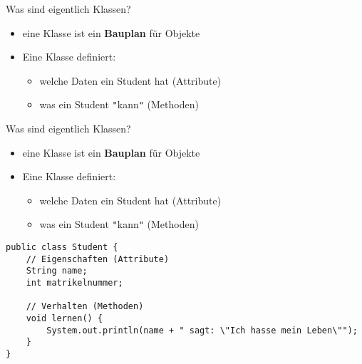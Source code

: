 \documentclass{../../presentation}
\begin{document}
\begin{frame}[fragile,t]{Was sind eigentlich Klassen?}

	\begin{minipage}[t][0.9\textheight][t]{\textwidth}
		\begin{itemize}
			\item eine Klasse ist ein \textbf{Bauplan} für Objekte
			\item<2->Eine Klasse definiert:
			      \begin{itemize}
				      \item[\textbullet] welche Daten ein Student hat (Attribute)
				      \item[\textbullet] was ein Student \texttt{"}kann\texttt{"} (Methoden)
			      \end{itemize}
		\end{itemize}

		\vspace{3.5cm}
	\end{minipage}

\end{frame}



\begin{frame}[fragile,t]{Was sind eigentlich Klassen?}

	\begin{minipage}[t][0.9\textheight][t]{\textwidth}
		\begin{itemize}
			\item eine Klasse ist ein \textbf{Bauplan} für Objekte
			\item Eine Klasse definiert:
			      \begin{itemize}
				      \item[\textbullet] welche Daten ein Student hat (Attribute)
				      \item[\textbullet] was ein Student \texttt{"}kann\texttt{"} (Methoden)
			      \end{itemize}
		\end{itemize}

		\begin{verbatim}
public class Student {
    // Eigenschaften (Attribute)
    String name;
    int matrikelnummer;

    // Verhalten (Methoden)
    void lernen() {
        System.out.println(name + " sagt: \"Ich hasse mein Leben\"");
    }
}
\end{verbatim}
	\end{minipage}
\end{frame}
\end{document}
